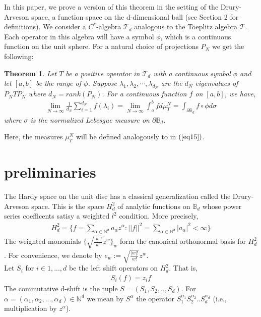 \documentclass[article]{amsart}
\newtheorem{theorem}            {Theorem}[section]
\begin{document}
In this paper, we prove a version of this theorem in the setting of the Drury-Arveson space, a function space on the d-dimensional ball (see Section 2 for definitions). We consider a $C^*$-algebra $\mathcal{T}_d$ analogous to the Toeplitz algebra $\mathcal{T}$. Each operator in this algebra will have a symbol $\phi$, which is a continuous function on the unit sphere. For a natural choice of projections $P_N$ we get the following:
\begin{theorem}\label{eq10}
    Let $T$ be a positive operator in $\mathcal{T}_d$ with a continuous symbol $\phi$ and let $[a,b]$ be the range of $\phi$. Suppose $\lambda_1, \lambda_2,\cdots, \lambda_{d_N}$ are the $d_N$ eigenvalues of $P_N TP_N$ where $d_N= rank(P_N)$. For a continuous function $f$ on $[a,b]$, we have,
    \begin{align*}
    \lim_{N \rightarrow \infty} \frac{1}{d_N} \sum_{i=1}^{d_N} f(\lambda_i) = \lim_{N \rightarrow \infty}\int_a^b f d \mu^{N}_T = \int_{\partial \mathbb{B}_d} f \circ \phi d \sigma
    \end{align*}
    where $\sigma$ is the normalized Lebesgue measure on  $\partial \mathbb{B}_d$.
\end{theorem}
\noindent Here, the measures $\mu_T^N$ will be defined analogously to in $(\ref{eq15})$.
\section{preliminaries}
The Hardy space on the unit disc has a classical generalization called the Drury-Arveson space. This is the space $H_d^2$ of analytic functions on $\mathbb{B}_d$ whose power series coefficents satisy a weighted $l^2$ condition. More precisely,
\begin{align*}
    H^2_d =\{f = \sum_{\alpha \in \mathbb{N}^d} a_{\alpha} z^{\alpha}: ||f||^2 = \sum_{\alpha \in \mathbb{N}^d} |a_{\alpha}|^2 < \infty \}
\end{align*}
The weighted monomials $\{\sqrt{\frac{|w|!}{w!}} z^w\}_w$ form the canonical orthonormal basis for $H_d^2$. For convenience, we denote by $e_w:= \sqrt{\frac{|w|!}{w!}} z^w$. \\

Let $S_i$ for $i \in {1,...,d}$ be the left shift operators on $H_d^2$. That is,
\begin{align*}
    S_i(f) = z_i f
\end{align*}The commutative d-shift is the tuple $S=(S_1,S_2,..,S_d)$. For $\alpha= (\alpha_1, \alpha_2,...,\alpha_d) \in \mathbb{N}^d$ we mean by $S^{\alpha}$ the operator $S_1^{\alpha_1}S_2^{\alpha_2}..S_d^{\alpha_d}$ (i.e., multiplication by $z^{\alpha}$). \\ 
\end{document}
